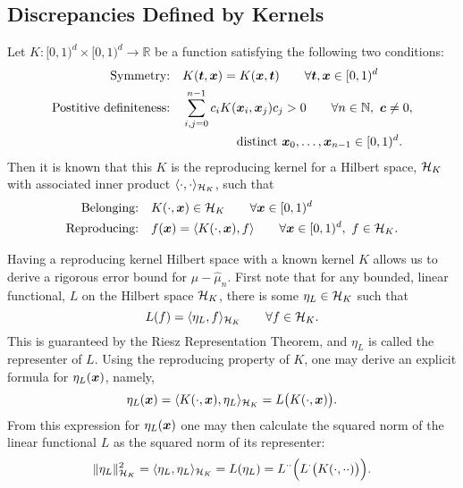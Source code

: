 \documentclass{svproc}
\begin{document}
\subsection{Discrepancies Defined by Kernels} \label{sec:kerdisc}
Let $K: [0,1)^d \times [0,1)^d \to \mathbb{R}$ be a function satisfying the following two conditions:
\begin{subequations} \label{eq:Kcond}
	\begin{align}
		\label{eq:KcondSym}
		\text{Symmetry:} \quad & K({\boldsymbol{t}},{\boldsymbol{x}}) = K({\boldsymbol{x}},{\boldsymbol{t}}) \qquad \forall {\boldsymbol{t}},{\boldsymbol{x}} \in [0,1)^d \\
		\nonumber
		\text{Postitive definiteness:} \quad & \sum_{i,j = 0}^{n-1} c_i K({\boldsymbol{x}}_i,{\boldsymbol{x}}_j) c_j > 0 \qquad  \forall n \in \mathbb{N}, \ {\boldsymbol{c}} \ne 0, \\
		& \qquad \qquad  \ \text{distinct } {\boldsymbol{x}}_0, \ldots, {\boldsymbol{x}}_{n-1} \in [0,1)^d. \label{eq:KcondPD}
	\end{align}
\end{subequations}
Then it is known \cite{Aro50} that this $K$ is the reproducing kernel for a Hilbert space, ${\mathcal{H}}_K$ with associated inner product $\langle \cdot, \cdot \rangle_{{\mathcal{H}}_K}$, such that
\begin{subequations}
	\begin{align}
	\text{Belonging:} \quad & K(\cdot,{\boldsymbol{x}}) \in {\mathcal{H}}_K \qquad \forall {\boldsymbol{x}} \in [0,1)^d \\
	\text{Reproducing:} \quad & f({\boldsymbol{x}}) = \langle K(\cdot,{\boldsymbol{x}}),f \rangle \qquad  \forall {\boldsymbol{x}} \in [0,1)^d, \ f \in {\mathcal{H}}_K.
\end{align}
\end{subequations}

Having a reproducing kernel Hilbert space with a known kernel $K$ allows us to derive a rigorous error bound for $\mu - \hat{\mu}_n$.  First note that for any bounded, linear functional, $L$ on the Hilbert space ${\mathcal{H}}_K$, there is some $\eta_L \in {\mathcal{H}}_K$ such that
\begin{equation*}
L(f) = \langle \eta_L , f \rangle_{{\mathcal{H}}_K} \qquad \forall f \in {\mathcal{H}}_K.
\end{equation*}
This is guaranteed by the Riesz Representation Theorem, and $\eta_L$ is called the representer of $L$.  Using the reproducing property of $K$, one may derive an explicit formula for $\eta_L({\boldsymbol{x}})$, namely,
\begin{equation*}
\eta_L({\boldsymbol{x}}) = \langle K(\cdot, {\boldsymbol{x}}), \eta_L \rangle_{{\mathcal{H}}_K} = L\bigl( K(\cdot,{\boldsymbol{x}}) \bigr).
\end{equation*}
From this expression for $\eta_L({\boldsymbol{x}})$ one may then calculate the squared norm of the linear functional $L$ as the squared norm of its representer:
\begin{equation} \label{eq:sqnormL}
	\lVert \eta_L \rVert_{{\mathcal{H}}_K}^2 = \langle\eta_L, \eta_L \rangle_{{\mathcal{H}}_K} = L(\eta_L) = L^{\cdot\cdot} \Bigl(L^{\cdot}\bigl( K(\cdot,\cdot \cdot) \bigr) \Bigr).
\end{equation}
\end{document}
